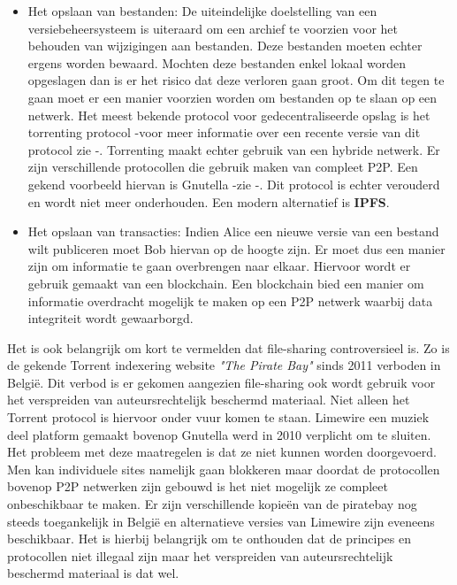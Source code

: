 \begin{itemize}
\item Het opslaan van bestanden: De uiteindelijke doelstelling van een versiebeheersysteem is uiteraard om een archief te voorzien voor het behouden van wijzigingen aan bestanden. Deze bestanden moeten echter ergens worden bewaard. Mochten deze bestanden enkel lokaal worden opgeslagen dan is er het risico dat deze verloren gaan groot. Om dit tegen te gaan moet er een manier voorzien worden om bestanden op te slaan op een netwerk. Het meest bekende protocol voor gedecentraliseerde opslag is het torrenting protocol -voor meer informatie over een recente versie van dit protocol zie \autocite{Cohen2008}-. Torrenting maakt echter gebruik van een hybride netwerk. Er zijn verschillende protocollen die gebruik maken van compleet P2P. Een gekend voorbeeld hiervan is Gnutella -zie \autocite{Klingberg2002}-. Dit protocol is echter verouderd en wordt niet meer onderhouden. Een modern alternatief is \textbf{IPFS}.\\

\item Het opslaan van transacties: Indien Alice een nieuwe versie van een bestand wilt publiceren moet Bob hiervan op de hoogte zijn. Er moet dus een manier zijn om informatie te gaan overbrengen naar elkaar. Hiervoor wordt er gebruik gemaakt van een blockchain. Een blockchain bied een manier om informatie overdracht mogelijk te maken op een P2P netwerk waarbij data integriteit wordt gewaarborgd. 
\end{itemize}

Het is ook belangrijk om kort te vermelden dat file-sharing controversieel is. Zo is de gekende Torrent indexering website \textit{"The Pirate Bay"} sinds 2011 verboden in België. Dit verbod is er gekomen aangezien file-sharing ook wordt gebruik voor het verspreiden van auteursrechtelijk beschermd materiaal. Niet alleen het Torrent protocol is hiervoor onder vuur komen te staan. Limewire een muziek deel platform gemaakt bovenop Gnutella werd in 2010 verplicht om te sluiten. Het probleem met deze maatregelen is dat ze niet kunnen worden doorgevoerd. Men kan individuele sites namelijk gaan blokkeren maar doordat de protocollen bovenop P2P netwerken zijn gebouwd is het niet mogelijk ze compleet onbeschikbaar te maken. Er zijn verschillende kopieën van de piratebay nog steeds toegankelijk in België en alternatieve versies van Limewire zijn eveneens beschikbaar. Het is hierbij belangrijk om te onthouden dat de principes en protocollen niet illegaal zijn maar het verspreiden van auteursrechtelijk beschermd materiaal is dat wel.\\

